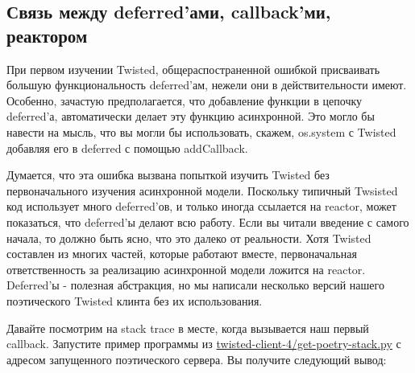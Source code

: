 \subsection{Связь между deferred'ами, callback'ми, реактором}


При первом изучении Twisted, общераспостраненной ошибкой 
присваивать большую функциональность deferred'ам, нежели 
они в действительности имеют. Особенно, зачастую предполагается, 
что добавление функции в цепочку deferred'а, автоматически 
делает эту функцию асинхронной. Это могло бы навести на мысль, 
что вы могли бы использовать, скажем, os.system с Twisted 
добавляя его в deferred с помощью addCallback.


Думается, что эта ошибка вызвана попыткой изучить 
Twisted без первоначального изучения асинхронной модели. 
Поскольку типичный Twsisted код использует много deferred'ов, 
и только иногда ссылается на reactor, может показаться, что 
deferred'ы делают всю работу. Если вы читали введение с 
самого начала, то должно быть ясно, что это далеко от реальности. 
Хотя Twisted составлен из многих частей, которые работают вместе, 
первоначальная ответственность за реализацию асинхронной 
модели ложится на reactor. Deferred'ы - полезная абстракция, но 
мы написали несколько версий нашего поэтического Twisted 
клинта без их использования.


Давайте посмотрим на stack trace в месте, когда вызывается 
наш первый callback. Запустите пример программы из 
\href{http://github.com/jdavisp3/twisted-intro/blob/master/twisted-client-4/get-poetry-stack.py}{twisted-client-4/get-poetry-stack.py} с адресом запущенного поэтического сервера. 
Вы получите следующий вывод:

